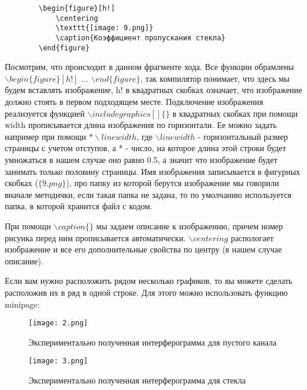     \begin{verbatim}
        \begin{figure}[h!]
            \centering
            \texttt{[image: 9.png]}
            \caption{Коэффициент пропускания стекла}
        \end{figure}
    \end{verbatim}
    
    Посмотрим, что происходит в данном фрагменте хода. Все функции обрамлены $\backslash begin\{figure\}[h!]$ ... $\backslash end\{figure\}$, так компилятор понимает, что здесь мы будем вставлять изображение, h! в квадратных скобках означает, что изображение должно стоять в первом подходящем месте. Подключение изображения реализуется функцией $\backslash includegraphics[]\{\}$ в квадратных скобках при помощи width прописывается длина изображения по горизонтали. Ее можно задать например при помощи $*\backslash linewidth$, где $\backslash linewidth$ - горизонтальный размер страницы с учетом отступов, а * - число, на которое длина этой строки будет умножаться в нашем случае оно равно 0.5, а значит что изображение будет занимать только половину страницы. Имя изображения записывается в фигурных скобках ($\{9.png\}$), про папку из которой берутся изображение мы говорили вначале методички, если такая папка не задана, то по умолчанию используется папка, в которой хранится файл с кодом.
    
    При помощи $\backslash caption\{\}$ мы задаем описание к изображению, причем номер рисунка перед ним прописывается автоматически. $\backslash centering$ распологает изображение и все его дополнительные свойства по центру (в нашем случае описание).
    
    Если вам нужно расположить рядом несколько графиков, то вы можете сделать расположив их в ряд в одной строке. Для этого можно использовать функцию minipage:
    
    \begin{figure}[h!]
        \begin{center}
            \begin{minipage}[h!]{0.48\linewidth}
                \texttt{[image: 2.png]}
                \caption{Экспериментально полученная интерферограмма для пустого канала}
            \end{minipage}
            \hfill
            \begin{minipage}[h!]{0.48\linewidth}
                \texttt{[image: 3.png]}
                \caption{Экспериментально полученная интерферограмма для стекла}
            \end{minipage}
        \end{center}
    \end{figure}
    
